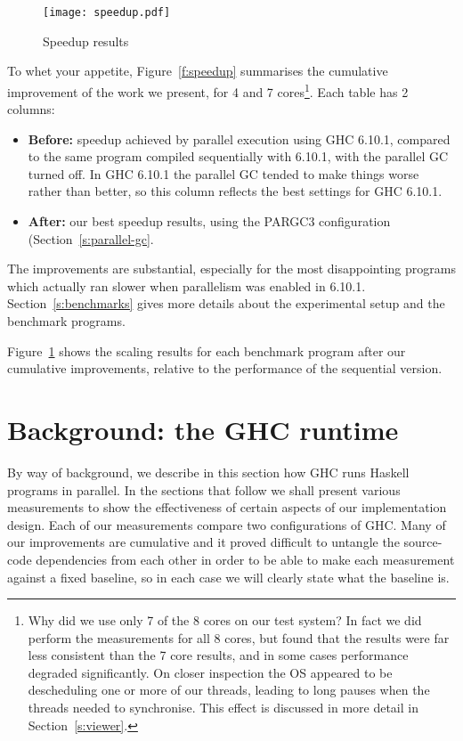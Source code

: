 \documentclass[twocolumn,9pt]{sigplanconf}
\begin{document}
\begin{figure}
\begin{center}
\texttt{[image: speedup.pdf]}
\end{center}
\caption{Speedup results}
\label{f:speedup-graph}
\end{figure}

To whet your appetite, Figure~\ref{f:speedup} summarises the cumulative
improvement of the work we present, for 4 and 7 cores\footnote{Why did we use only 7 of the 8 cores on our test system?  In fact we
did perform the measurements for all 8 cores, but found that the
results were far less consistent than the 7 core results, and in some
cases performance degraded significantly.  On closer inspection the OS
appeared to be descheduling one or more of our threads, leading to
long pauses when the threads needed to synchronise.  This effect is
discussed in more detail in Section~\ref{s:viewer}.}.
Each table has 2 columns:

\begin{itemize}
\item {\bf Before:} speedup achieved by parallel execution using GHC 6.10.1,
compared to the same program compiled sequentially with 6.10.1, with the
  parallel GC turned off. In GHC 6.10.1 the parallel GC tended to make
  things worse rather than better,
  so this column reflects the best settings for GHC 6.10.1.
\item {\bf After:} our best speedup results, using the PARGC3 configuration
  (Section~\ref{s:parallel-gc}.
\end{itemize}
The improvements are substantial, especially for the most disappointing 
programs which actually ran slower when parallelism was enabled in 6.10.1.
Section~\ref{s:benchmarks} gives more details about the experimental 
setup and the benchmark programs.

Figure~\ref{f:speedup-graph} shows the scaling results for each
benchmark program after our cumulative improvements, relative to the
performance of the sequential version.

\section{Background: the GHC runtime}
\label{s:implementation}

By way of background, we describe in this section how GHC
runs Haskell programs in parallel.
In the sections that follow we shall present various measurements to
show the effectiveness of certain aspects of our implementation
design.  
Each of our measurements compare two configurations of GHC.  Many
of our improvements are cumulative and it proved difficult to untangle
the source-code dependencies from each other in order to be able to
make each measurement against a fixed baseline, so in each case we
will clearly state what the baseline is.
\end{document}
